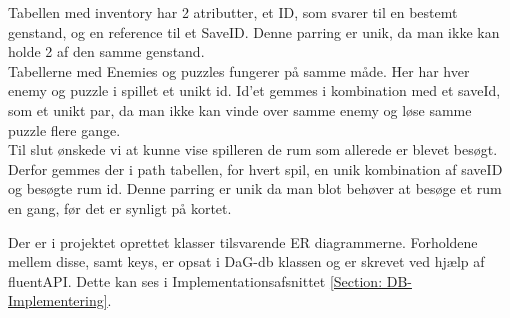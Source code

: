 Tabellen med inventory har 2 atributter, et ID, som svarer til en bestemt genstand, og en reference til et SaveID. Denne parring er unik, da man ikke kan holde 2 af den samme genstand.\\
Tabellerne med Enemies og puzzles fungerer på samme måde. Her har hver enemy og puzzle i spillet et unikt id. Id’et gemmes i kombination med et saveId, som et unikt par, da man ikke kan vinde over samme enemy og løse samme puzzle flere gange.\\
Til slut ønskede vi at kunne vise spilleren de rum som allerede er blevet besøgt. Derfor gemmes der i path tabellen, for hvert spil, en unik kombination af saveID og besøgte rum id. Denne parring er unik da man blot behøver at besøge et rum en gang, før det er synligt på kortet. 

Der er i projektet oprettet klasser tilsvarende ER diagrammerne.
Forholdene mellem disse, samt keys, er opsat i DaG-db klassen og er skrevet ved hjælp af fluentAPI. Dette kan ses i Implementationsafsnittet \autoref{Section: DB-Implementering}.
